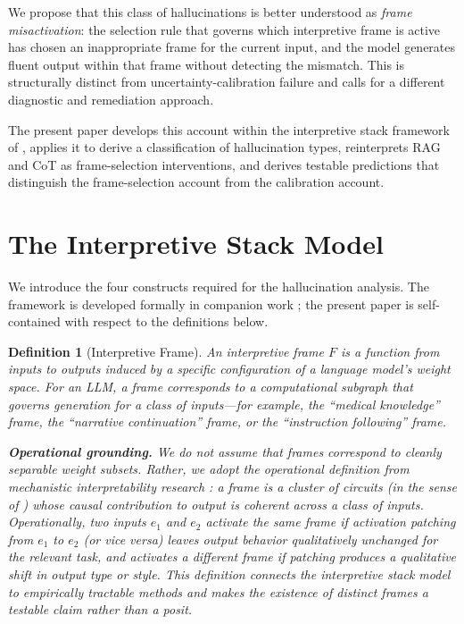 \documentclass[12pt]{article}
\newtheorem{definition}{Definition}
\begin{document}
We propose that this class of hallucinations is better understood as
\emph{frame misactivation}: the selection rule that governs which
interpretive frame is active has chosen an inappropriate frame for
the current input, and the model generates fluent output within that
frame without detecting the mismatch. This is structurally distinct
from uncertainty-calibration failure and calls for a different
diagnostic and remediation approach.

The present paper develops this account within the interpretive stack
framework of \cite{minamoto2026accumulation}, applies
it to derive a classification of hallucination types, reinterprets
RAG and CoT as frame-selection interventions, and derives testable
predictions that distinguish the frame-selection account from the
calibration account.

\section{The Interpretive Stack Model}

We introduce the four constructs required for the hallucination
analysis. The framework is developed formally in companion work
\cite{minamoto2026accumulation}; the present paper
is self-contained with respect to the definitions below.

\begin{definition}[Interpretive Frame]
An \emph{interpretive frame} $F$ is a function from inputs to outputs
induced by a specific configuration of a language model's weight
space. For an LLM, a frame corresponds to a computational subgraph
that governs generation for a class of inputs---for example, the
``medical knowledge'' frame, the ``narrative continuation'' frame,
or the ``instruction following'' frame.

\textbf{Operational grounding.} We do not assume that frames
correspond to cleanly separable weight subsets. Rather, we adopt the
operational definition from mechanistic interpretability research
\cite{conmy2023towards, bricken2023monosemanticity}: a frame is
a cluster of circuits (in the sense of \cite{elhage2021mathematical})
whose causal contribution to output is coherent across a class of
inputs. Operationally, two inputs $e_1$ and $e_2$ activate the
\emph{same frame} if activation patching from $e_1$ to $e_2$ (or
vice versa) leaves output behavior qualitatively unchanged for the
relevant task, and activates a \emph{different frame} if patching
produces a qualitative shift in output type or style. This definition
connects the interpretive stack model to empirically tractable methods
and makes the existence of distinct frames a testable claim rather
than a posit.
\end{definition}
\end{document}
